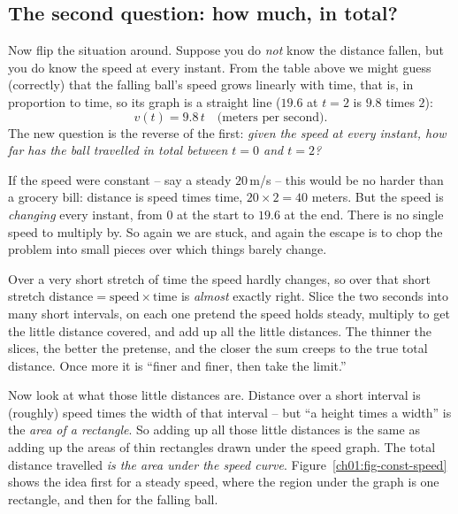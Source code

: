 \subsection{The second question: how much, in total?}

Now flip the situation around. Suppose you do \emph{not} know the distance
fallen, but you do know the speed at every instant. From the table above we
might guess (correctly) that the falling ball's speed grows linearly with time,
that is, in proportion to time, so its graph is a straight line ($19.6$ at
$t=2$ is $9.8$ times $2$):
\[
  v(t) = 9.8\,t \quad\text{(meters per second).}
\]
The new question is the reverse of the first: \emph{given the speed at every
instant, how far has the ball travelled in total between $t = 0$ and $t = 2$?}

If the speed were constant -- say a steady $20$\,m/s -- this would be no harder
than a grocery bill: distance is speed times time, $20 \times 2 = 40$ meters.
But the speed is \emph{changing} every instant, from $0$ at the start to $19.6$
at the end. There is no single speed to multiply by. So again we are stuck, and
again the escape is to chop the problem into small pieces over which things
barely change.

\begin{intuitionbox}
Over a very short stretch of time the speed hardly changes, so over that short
stretch $\text{distance} = \text{speed} \times \text{time}$ is \emph{almost} exactly right.
Slice the two seconds into many short intervals, on each one pretend the speed
holds steady, multiply to get the little distance covered, and add up all the
little distances. The thinner the slices, the better the pretense, and the
closer the sum creeps to the true total distance. Once more it is ``finer and
finer, then take the limit.''
\end{intuitionbox}

Now look at what those little distances are. Distance over a short interval is
(roughly) speed times the width of that interval -- but ``a height times a width''
is the \emph{area of a rectangle}. So adding up all those little distances is the
same as adding up the areas of thin rectangles drawn under the speed graph. The
total distance travelled \emph{is the area under the speed curve}.
Figure~\ref{ch01:fig-const-speed} shows the idea first for a steady speed, where
the region under the graph is one rectangle, and then for the falling ball.

